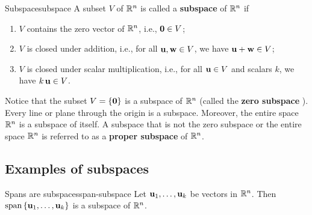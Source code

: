 \begin{definition}{Subspace}{subspace}
  A subset $V$ of $\mathbb{R}^n$ is called a \textbf{subspace}%
   of $\mathbb{R}^n$ if
  \begin{enumerate}
  \item $V$ contains the zero vector of $\mathbb{R}^n$, i.e., $\mbox{\bf 0}\in V$;
  \item $V$ is closed under addition, i.e., for all\/
    $\mbox{\bf u},\mbox{\bf w}\in V$, we have $\mbox{\bf u}+\mbox{\bf w}\in V$;
  \item $V$ is closed under scalar multiplication, i.e., for all\/
    $\mbox{\bf u}\in V$ and scalars $k$, we have\/ $k\,\mbox{\bf u}\in V$.
  \end{enumerate}
\end{definition}

Notice that the subset $V = \left\{\mbox{\bf 0}\right\}$ is a subspace of $\mathbb{R}^n$
(called the \textbf{zero subspace}%
). Every line or plane through the
origin is a subspace. Moreover, the entire space $\mathbb{R}^n$ is a subspace
of itself. A subspace that is not the zero subspace or the entire
space $\mathbb{R}^n$ is referred to as a \textbf{proper subspace}%
 of $\mathbb{R}^n$.

\subsection{Examples of subspaces}

\begin{proposition}{Spans are subspaces}{span-subspace}
  Let $\mbox{\bf u}_1,\ldots,\mbox{\bf u}_k$ be vectors in $\mathbb{R}^{n}$. Then
  $\sspan\set{\vect{u}_1,\ldots,\vect{u}_k}$ is a subspace of
  $\mathbb{R}^{n}$.%
\end{proposition}

